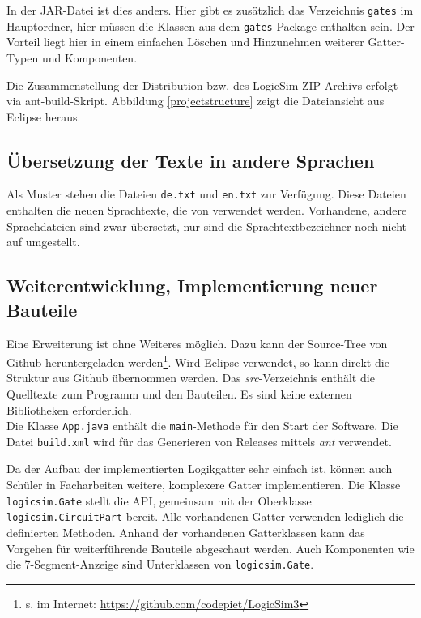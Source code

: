 \documentclass[12pt]{scrartcl}
\begin{document}
In der JAR-Datei ist dies anders. Hier gibt es zusätzlich das Verzeichnis \texttt{gates} im Hauptordner, hier müssen die Klassen aus dem \texttt{gates}-Package enthalten sein. Der Vorteil liegt hier in einem einfachen Löschen und Hinzunehmen weiterer Gatter-Typen und Komponenten.

Die Zusammenstellung der Distribution bzw. des LogicSim-ZIP-Archivs erfolgt via ant-build-Skript. Abbildung \ref{projectstructure} zeigt die Dateiansicht aus Eclipse heraus.


\subsection{Übersetzung der Texte in andere Sprachen}
Als Muster stehen die Dateien \texttt{de.txt} und \texttt{en.txt} zur Verfügung. Diese Dateien enthalten die neuen Sprachtexte, die von \lsN{} verwendet werden. Vorhandene, andere Sprachdateien sind zwar übersetzt, nur sind die Sprachtextbezeichner noch nicht auf \lsN{} umgestellt.

\subsection{Weiterentwicklung, Implementierung neuer Bauteile}
Eine Erweiterung ist ohne Weiteres möglich. Dazu kann der Source-Tree von Github heruntergeladen werden\footnote{s. im Internet: \url{https://github.com/codepiet/LogicSim3}}. Wird Eclipse verwendet, so kann direkt die Struktur aus Github übernommen werden. Das \textit{src}-Verzeichnis enthält die Quelltexte zum Programm und den Bauteilen. Es sind keine externen Bibliotheken erforderlich.\\

Die Klasse \texttt{App.java} enthält die \texttt{main}-Methode für den Start der Software.
Die Datei \texttt{build.xml} wird für das Generieren von Releases mittels \textit{ant} verwendet.

Da der Aufbau der implementierten Logikgatter sehr einfach ist, können auch Schüler in Facharbeiten weitere, komplexere Gatter implementieren. Die Klasse \texttt{logicsim.Gate} stellt die API, gemeinsam mit der Oberklasse \texttt{logicsim.CircuitPart} bereit. Alle vorhandenen Gatter verwenden lediglich die definierten Methoden. Anhand der vorhandenen Gatterklassen kann das Vorgehen für weiterführende Bauteile abgeschaut werden. Auch Komponenten wie die 7-Segment-Anzeige sind Unterklassen von \texttt{logicsim.Gate}.\\
\end{document}
